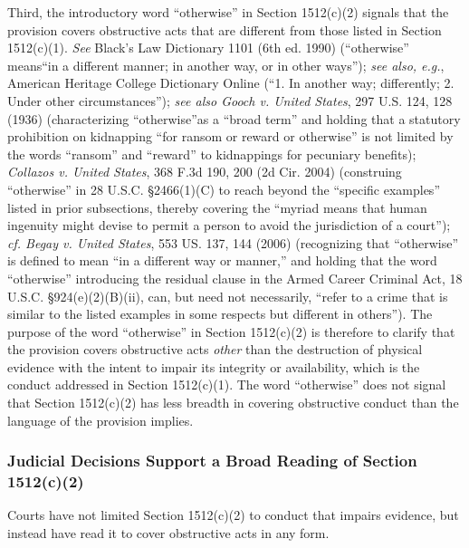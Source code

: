 Third, the introductory word “otherwise” in Section 1512(c)(2) signals that the provision covers obstructive acts that are different from those listed in Section 1512(c)(1).
\textit{See} Black’s Law Dictionary 1101 (6th ed. 1990) (“otherwise” means“in a different manner; in another way, or in other ways”);
\textit{see also, e.g.}, American Heritage College Dictionary Online (“1. In another way; differently; 2. Under other circumstances”);
\textit{see also Gooch v. United States}, 297 U.S. 124, 128 (1936) (characterizing “otherwise”as a “broad term” and holding that a statutory prohibition on kidnapping “for ransom or reward or otherwise” is not limited by the words “ransom” and “reward” to kidnappings for pecuniary benefits);
\textit{Collazos v. United States}, 368 F.3d 190, 200 (2d Cir. 2004) (construing “otherwise” in 28 U.S.C. \S 2466(1)(C) to reach beyond the “specific examples” listed in prior subsections, thereby covering the “myriad means that human ingenuity might devise to permit a person to avoid the jurisdiction of a court”);
\textit{cf. Begay v. United States}, 553 US. 137, 144 (2006) (recognizing that “otherwise” is defined to mean “in a different way or manner,” and holding that the word “otherwise” introducing the residual clause in the Armed Career Criminal Act, 18 U.S.C. \S 924(e)(2)(B)(ii), can, but need not necessarily, “refer to a crime that is similar to the listed examples in some respects but different in others”).%
The purpose of the word “otherwise” in Section 1512(c)(2) is therefore to clarify that the provision covers obstructive acts \textit{other} than the destruction of physical evidence with the intent to impair its integrity or availability, which is the conduct addressed in Section 1512(c)(1).
The word “otherwise” does not signal that Section 1512(c)(2) has less breadth in covering obstructive conduct than the language of the provision implies.

\subsubsection{Judicial Decisions Support a Broad Reading of Section 1512(c)(2)}

Courts have not limited Section 1512(c)(2) to conduct that impairs evidence, but instead have read it to cover obstructive acts in any form.

